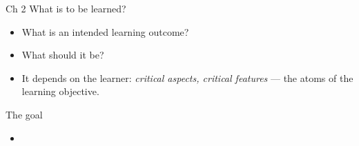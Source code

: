 \begin{frame}
  \begin{block}{Ch 2 What is to be learned?}
    \begin{itemize}
      \item What is an intended learning outcome?
      \item What should it be?
      \item It depends on the learner: \emph{critical aspects, critical 
        features} --- the atoms of the learning objective.
    \end{itemize}
  \end{block}

  \pause

  \begin{block}{The goal}
    \begin{itemize}
      \item {}
    \end{itemize}
  \end{block}
\end{frame}

